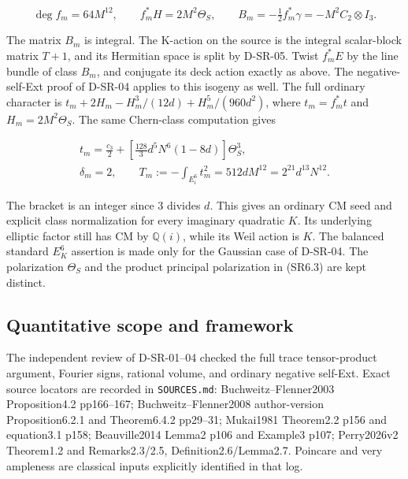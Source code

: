 \[
\deg f_m=64M^{12},\qquad f_m^*H=2M^2\Theta_S,\qquad B_m=-\tfrac12f_m^*\gamma=-M^2C_2\otimes I_3.\tag{SR6.5}
\]

The matrix \(B_m\) is integral. The K-action on the source is the integral scalar-block matrix \(T+1\), and its Hermitian space is split by D-SR-05. Twist \(f_m^*E\) by the line bundle of class \(B_m\), and conjugate its deck action exactly as above. The negative-self-Ext proof of D-SR-04 applies to this isogeny as well. The full ordinary character is \(t_m+2H_m-H_m^3/(12d)+H_m^5/(960d^2)\), where \(t_m=f_m^*t\) and \(H_m=2M^2\Theta_S\). The same Chern-class computation gives

\[
\begin{gathered}t_m=\frac{c_3}{2}+\left[\frac{128}{3}d^5N^6(1-8d)\right]\Theta_S^3,\\\delta_m=2,\qquad T_m:=-\int_{E_i^6}t_m^2=512dM^{12}=2^{21}d^{13}N^{12}.\end{gathered}\tag{SR6.6}
\]

The bracket is an integer since 3 divides \(d\). This gives an ordinary CM seed and explicit class normalization for every imaginary quadratic \(K\). Its underlying elliptic factor still has CM by \(\mathbb Q(i)\), while its Weil action is \(K\). The balanced standard \(E_K^6\) assertion is made only for the Gaussian case of D-SR-04. The polarization \(\Theta_S\) and the product principal polarization in (SR6.3) are kept distinct.

\subsection{Quantitative scope and framework}

The independent review of D-SR-01--04 checked the full trace tensor-product argument, Fourier signs, rational volume, and ordinary negative self-Ext. Exact source locators are recorded in \texttt{SOURCES.md}: Buchweitz--Flenner2003 Proposition4.2 pp166--167; Buchweitz--Flenner2008 author-version Proposition6.2.1 and Theorem6.4.2 pp29--31; Mukai1981 Theorem2.2 p156 and equation3.1 p158; Beauville2014 Lemma2 p106 and Example3 p107; Perry2026v2 Theorem1.2 and Remarks2.3/2.5, Definition2.6/Lemma2.7. Poincare and very ampleness are classical inputs explicitly identified in that log. \cite{SR-Perry2026}

